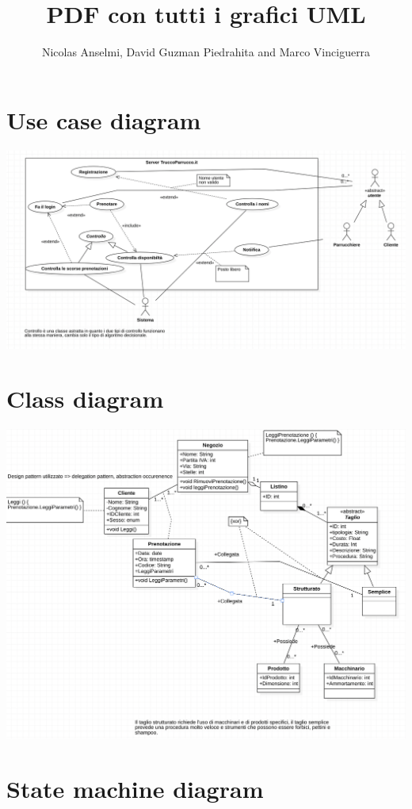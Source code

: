 \documentclass{article}
\title{PDF con tutti i grafici UML}
\author{Nicolas Anselmi, David Guzman Piedrahita and Marco Vinciguerra}
\begin{document}
\maketitle
\section{Use case diagram}

\includegraphics[scale = 0.5]{Immagini/UseCaseDiagram.png}

\section{Class diagram}
\includegraphics[scale = 0.5]{Immagini/ClassDiagram.png}

\section{State machine diagram}
\end{document}

